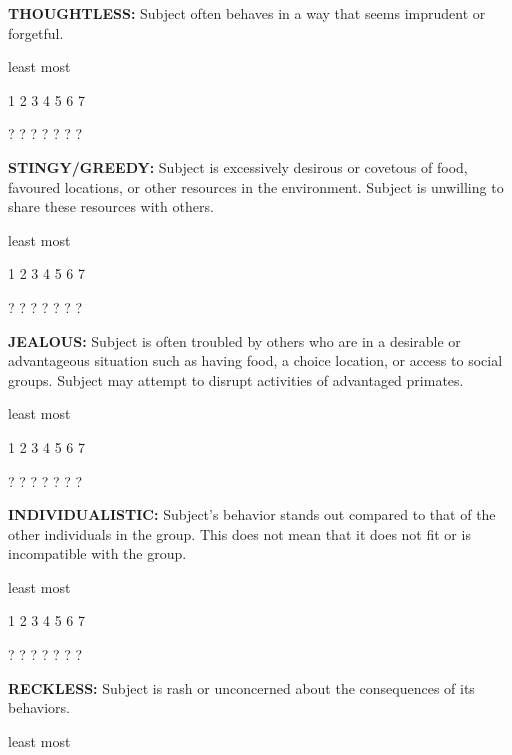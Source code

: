 \documentclass{article} %
\begin{document}
\noindent \textbf{THOUGHTLESS:} Subject often behaves in a way that seems imprudent or forgetful. 

\noindent  

\noindent least                            most

  1    2    3    4    5    6    7   

  ?    ?    ?    ?    ?    ?    ?   

\noindent  

\noindent \textbf{STINGY/GREEDY:} Subject is excessively desirous or covetous of food, favoured locations, or other resources in the environment. Subject is unwilling to share these resources with others. 

\noindent  

\noindent least                            most

  1    2    3    4    5    6    7   

  ?    ?    ?    ?    ?    ?    ?   

\noindent  

\noindent \textbf{JEALOUS:} Subject is often troubled by others who are in a desirable or advantageous situation such as having food, a choice location, or access to social groups. Subject may attempt to disrupt activities of advantaged primates. 

\noindent  

\noindent least                            most

  1    2    3    4    5    6    7   

  ?    ?    ?    ?    ?    ?    ?   

\noindent  

\noindent \textbf{INDIVIDUALISTIC:} Subject's behavior stands out compared to that of the other individuals in the group. This does not mean that it does not fit or is incompatible with the group. 

\noindent  

\noindent least                            most

  1    2    3    4    5    6    7   

  ?    ?    ?    ?    ?    ?    ?   

\noindent \textbf{ }

\noindent \textbf{RECKLESS:} Subject is rash or unconcerned about the consequences of its behaviors. 

\noindent  

\noindent least                            most
\end{document}
